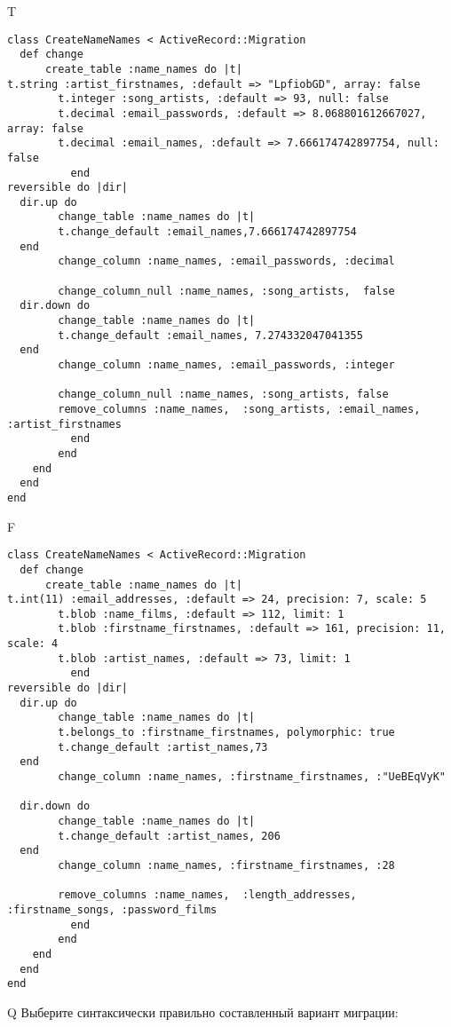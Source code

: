 T
\begin{verbatim}
class CreateNameNames < ActiveRecord::Migration
  def change
	  create_table :name_names do |t|
t.string :artist_firstnames, :default => "LpfiobGD", array: false
		t.integer :song_artists, :default => 93, null: false
		t.decimal :email_passwords, :default => 8.068801612667027, array: false
		t.decimal :email_names, :default => 7.666174742897754, null: false
		  end
reversible do |dir|
  dir.up do
		change_table :name_names do |t|
		t.change_default :email_names,7.666174742897754
  end
 		change_column :name_names, :email_passwords, :decimal
   
		change_column_null :name_names, :song_artists,  false
  dir.down do
		change_table :name_names do |t|
		t.change_default :email_names, 7.274332047041355
  end
 		change_column :name_names, :email_passwords, :integer
   
		change_column_null :name_names, :song_artists, false
 		remove_columns :name_names,  :song_artists, :email_names, :artist_firstnames 
	      end
	    end
    end 
  end
end

\end{verbatim}

F
\begin{verbatim}
class CreateNameNames < ActiveRecord::Migration
  def change
	  create_table :name_names do |t|
t.int(11) :email_addresses, :default => 24, precision: 7, scale: 5
		t.blob :name_films, :default => 112, limit: 1
		t.blob :firstname_firstnames, :default => 161, precision: 11, scale: 4
		t.blob :artist_names, :default => 73, limit: 1
		  end
reversible do |dir|
  dir.up do
		change_table :name_names do |t|
		t.belongs_to :firstname_firstnames, polymorphic: true
 		t.change_default :artist_names,73
  end
 		change_column :name_names, :firstname_firstnames, :"UeBEqVyK"
   
  dir.down do
		change_table :name_names do |t|
		t.change_default :artist_names, 206
  end
 		change_column :name_names, :firstname_firstnames, :28
   
		remove_columns :name_names,  :length_addresses, :firstname_songs, :password_films 
	      end
	    end
    end 
  end
end

\end{verbatim}

Q
Выберите синтаксически правильно составленный вариант миграции:

